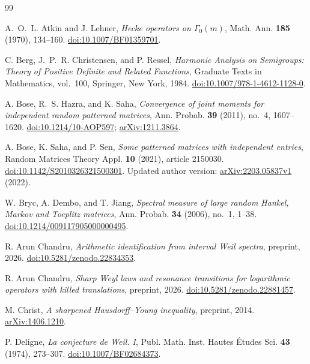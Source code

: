 \documentclass[11pt,reqno]{amsart}
\numberwithin{equation}{section}
\begin{document}
\begin{thebibliography}{99}

A.~O.~L. Atkin and J. Lehner,
\emph{Hecke operators on $\Gamma_0(m)$},
Math. Ann. \textbf{185} (1970), 134--160.
\href{https://doi.org/10.1007/BF01359701}{doi:10.1007/BF01359701}.

C. Berg, J.~P.~R. Christensen, and P. Ressel,
\emph{Harmonic Analysis on Semigroups: Theory of Positive Definite
and Related Functions},
Graduate Texts in Mathematics, vol.~100, Springer, New York, 1984.
\href{https://doi.org/10.1007/978-1-4612-1128-0}{doi:10.1007/978-1-4612-1128-0}.

A. Bose, R.~S. Hazra, and K. Saha,
\emph{Convergence of joint moments for independent random patterned matrices},
Ann. Probab. \textbf{39} (2011), no.~4, 1607--1620.
\href{https://doi.org/10.1214/10-AOP597}{doi:10.1214/10-AOP597};
\href{https://arxiv.org/abs/1211.3864}{arXiv:1211.3864}.

A. Bose, K. Saha, and P. Sen,
\emph{Some patterned matrices with independent entries},
Random Matrices Theory Appl. \textbf{10} (2021), article 2150030.
\href{https://doi.org/10.1142/S2010326321500301}{doi:10.1142/S2010326321500301}.
Updated author version:
\href{https://arxiv.org/abs/2203.05837v1}{arXiv:2203.05837v1} (2022).

W. Bryc, A. Dembo, and T. Jiang,
\emph{Spectral measure of large random Hankel, Markov and Toeplitz matrices},
Ann. Probab. \textbf{34} (2006), no.~1, 1--38.
\href{https://doi.org/10.1214/009117905000000495}{doi:10.1214/009117905000000495}.

R. Arun Chandru,
\emph{Arithmetic identification from interval Weil spectra},
preprint, 2026.
\href{https://doi.org/10.5281/zenodo.22834353}{doi:10.5281/zenodo.22834353}.


R. Arun Chandru,
\emph{Sharp Weyl laws and resonance transitions for logarithmic
operators with killed translations},
preprint, 2026.
\href{https://doi.org/10.5281/zenodo.22881457}{doi:10.5281/zenodo.22881457}.


M. Christ,
\emph{A sharpened Hausdorff--Young inequality},
preprint, 2014.
\href{https://arxiv.org/abs/1406.1210}{arXiv:1406.1210}.

P. Deligne,
\emph{La conjecture de Weil. I},
Publ. Math. Inst. Hautes \'Etudes Sci. \textbf{43} (1974), 273--307.
\href{https://doi.org/10.1007/BF02684373}{doi:10.1007/BF02684373}.


\end{thebibliography}
\end{document}
